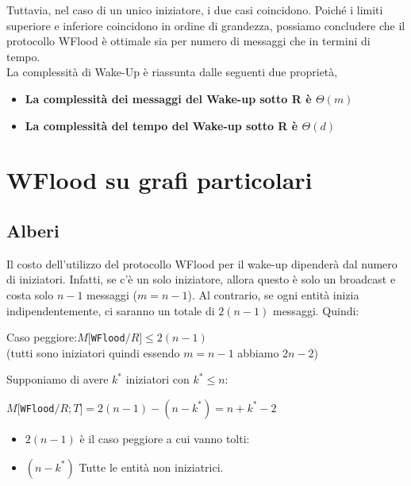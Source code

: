 Tuttavia, nel caso di un unico iniziatore, i due casi coincidono. Poiché i limiti superiore e inferiore coincidono in ordine di grandezza, possiamo concludere che il protocollo WFlood è ottimale sia per numero di messaggi che in termini di tempo.\\
La complessità di Wake-Up è riassunta dalle seguenti due proprietà,
\begin{itemize}
    \item \textbf{La complessità dei messaggi del Wake-up sotto R è $\Theta(m)$}
    \item \textbf{La complessità del tempo del Wake-up sotto R è $\Theta(d)$}\\
\end{itemize}

\section{WFlood su grafi particolari}
\subsection{Alberi}
Il costo dell'utilizzo del protocollo WFlood per il wake-up dipenderà dal numero di iniziatori. Infatti, se c'è un solo iniziatore, allora questo è solo un broadcast e costa solo $n - 1$ messaggi ($m=n-1$). Al contrario, se ogni entità inizia indipendentemente, ci saranno un totale di $2(n - 1)$ messaggi. Quindi:
  \begin{center}
    Caso peggiore:$M[$\texttt{WFlood}$/R] \leq 2(n-1)$ \\
    (tutti sono iniziatori quindi essendo $m = n-1$ abbiamo $2 n-2$)
  \end{center}
  Supponiamo di avere $k^*$ iniziatori con $k^* \leq n$:
  \begin{center}
     $M[$\texttt{WFlood}$/R;T]= 2(n-1) - (n-k^*) = n+k^*-2$\\
    \begin{itemize}
        \item $2(n-1)$ è il caso peggiore a cui vanno tolti:
        \item $(n-k^*)$ Tutte le entità non iniziatrici.
    \end{itemize}
  \end{center}
    
